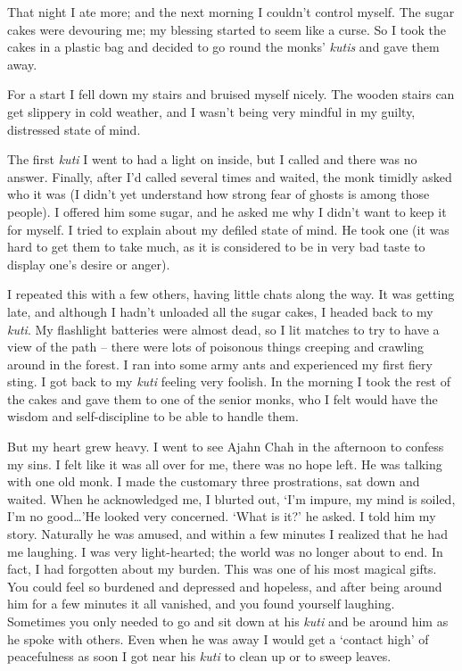 That night I ate more; and the next morning I couldn't control myself.
The sugar cakes were devouring me; my blessing started to seem like a
curse. So I took the cakes in a plastic bag and decided to go round the
monks' \emph{kutis} and gave them away.

For a start I fell down my stairs and bruised myself nicely. The wooden
stairs can get slippery in cold weather, and I wasn't being very mindful
in my guilty, distressed state of mind.

The first \emph{kuti} I went to had a light on inside, but I called and
there was no answer. Finally, after I'd called several times and waited,
the monk timidly asked who it was (I didn't yet understand how strong
fear of ghosts is among those people). I offered him some sugar, and he
asked me why I didn't want to keep it for myself. I tried to explain
about my defiled state of mind. He took one (it was hard to get them to
take much, as it is considered to be in very bad taste to display one's
desire or anger).

I repeated this with a few others, having little chats along the way. It
was getting late, and although I hadn't unloaded all the sugar cakes, I
headed back to my \emph{kuti}. My flashlight batteries were almost dead,
so I lit matches to try to have a view of the path -- there were lots of
poisonous things creeping and crawling around in the forest. I ran into
some army ants and experienced my first fiery sting. I got back to my
\emph{kuti} feeling very foolish. In the morning I took the rest of the
cakes and gave them to one of the senior monks, who I felt would have
the wisdom and self-discipline to be able to handle them.

But my heart grew heavy. I went to see Ajahn Chah in the afternoon to
confess my sins. I felt like it was all over for me, there was no hope
left. He was talking with one old monk. I made the customary three
prostrations, sat down and waited. When he acknowledged me, I blurted
out, `I'm impure, my mind is soiled, I'm no good\ldots{}'He looked very
concerned. `What is it?' he asked. I told him my story. Naturally he was
amused, and within a few minutes I realized that he had me laughing. I
was very light-hearted; the world was no longer about to end. In fact, I
had forgotten about my burden. This was one of his most magical gifts.
You could feel so burdened and depressed and hopeless, and after being
around him for a few minutes it all vanished, and you found yourself
laughing. Sometimes you only needed to go and sit down at his
\emph{kuti} and be around him as he spoke with others. Even when he was
away I would get a `contact high' of peacefulness as soon I got near his
\emph{kuti} to clean up or to sweep leaves.

